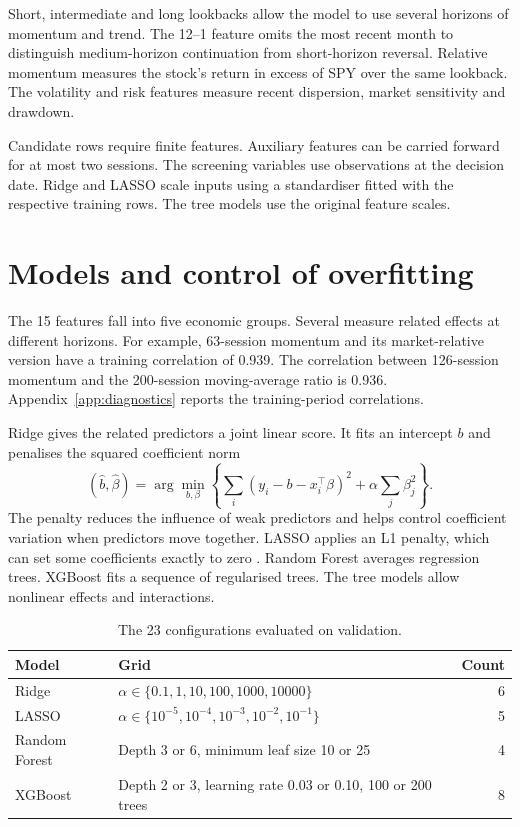 \documentclass[11pt,a4paper]{article}
\begin{document}


Short, intermediate and long lookbacks allow the model to use several horizons of momentum and trend. The 12--1 feature omits the most recent month to distinguish medium-horizon continuation from short-horizon reversal. Relative momentum measures the stock's return in excess of SPY over the same lookback. The volatility and risk features measure recent dispersion, market sensitivity and drawdown.

Candidate rows require finite features. Auxiliary features can be carried forward for at most two sessions. The screening variables use observations at the decision date. Ridge and LASSO scale inputs using a standardiser fitted with the respective training rows. The tree models use the original feature scales.

\clearpage
\section{Models and control of overfitting}
\label{sec:model}
The 15 features fall into five economic groups. Several measure related effects at different horizons. For example, 63-session momentum and its market-relative version have a training correlation of 0.939. The correlation between 126-session momentum and the 200-session moving-average ratio is 0.936. Appendix~\ref{app:diagnostics} reports the training-period correlations.

Ridge gives the related predictors a joint linear score. It fits an intercept \(b\) and penalises the squared coefficient norm \citep{hoerl1970}
\[
(\hat b,\hat\beta)
=\arg\min_{b,\beta}\left\{
\sum_i (y_i-b-x_i^\top\beta)^2 + \alpha\sum_j\beta_j^2
\right\}.
\]
The penalty reduces the influence of weak predictors and helps control coefficient variation when predictors move together.  LASSO applies an L1 penalty, which can set some coefficients exactly to zero \citep{tibshirani1996}. Random Forest averages regression trees. XGBoost fits a sequence of regularised trees. The tree models allow nonlinear effects and interactions.

\begin{table}[H]
\centering
\begin{tabular}{lp{8.7cm}r}
\toprule
Model & Grid & Count \\
\midrule
Ridge & \(\alpha\in\{0.1,1,10,100,1000,10000\}\) & 6 \\
LASSO & \(\alpha\in\{10^{-5},10^{-4},10^{-3},10^{-2},10^{-1}\}\) & 5 \\
Random Forest & Depth 3 or 6, minimum leaf size 10 or 25 & 4 \\
XGBoost & Depth 2 or 3, learning rate 0.03 or 0.10, 100 or 200 trees & 8 \\
\bottomrule
\end{tabular}
\caption{The 23 configurations evaluated on validation.}
\label{tab:grid}
\end{table}
\end{document}
